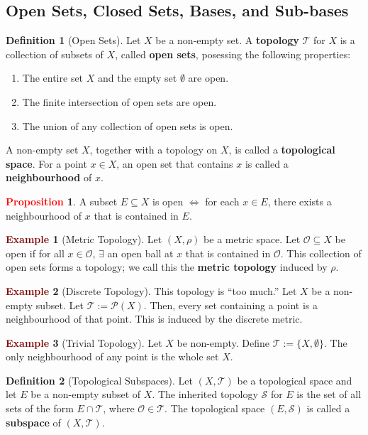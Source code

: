 \documentclass[11pt]{article}
\newcommand{\open}[0]{\mathcal{O}}
\newcommand{\topo}[0]{\mathcal{T}}
\theoremstyle{definition}
\theoremstyle{definition}
\theoremstyle{definition}
\newtheorem{definition}{\textcolor{OliveGreen}{Definition}}
\newtheorem{prop}{\textcolor{red}{Proposition}}
\newtheorem{ex}{\textcolor{Maroon}{Example}}
\theoremstyle{remark}
\begin{document}
\subsection{Open Sets, Closed Sets, Bases, and Sub-bases}

\begin{definition}[Open Sets] 
	Let $X$ be a non-empty set. A \textbf{topology} $\topo$ for $X$ is a collection of subsets of $X$, called \textbf{open sets}, posessing the following properties: 
	\begin{enumerate}[noitemsep]
		\item The entire set $X$ and the empty set $\emptyset$ are open. 
		\item The finite intersection of open sets are open. 
		\item The union of any collection of open sets is open. 
	\end{enumerate}
	A non-empty set $X$, together with a topology on $X$, is called a \textbf{topological space}. For a point $x \in X$, an open set that contains $x$ is called a \textbf{neighbourhood} of $x$. 
\end{definition}

\begin{prop}
	A subset $E \subseteq X$ is open $\iff$ for each $x \in E$, there exists a neighbourhood of $x$ that is contained in $E$. 
\end{prop}

\begin{ex}[Metric Topology]
	Let $(X, \rho)$ be a metric space. Let $\open \subseteq X$ be  open if for all $x \in \open$, $\exists$ an open ball at $x$ that is contained in $\open$. This collection of open sets forms a topology; we call this the \textbf{metric topology} induced by $\rho$. 
\end{ex}

\begin{ex}[Discrete Topology] 
	This topology is ``too much.'' Let $X$ be a non-empty subset. Let $\topo := \mathcal{P}(X)$. Then, every set containing a point is a neighbourhood of that point. This is induced by the discrete metric. 
\end{ex}

\begin{ex}[Trivial Topology]
	Let $X$ be non-empty. Define $\topo := \{ X, \emptyset \}$. The only neighbourhood of any point is the whole set $X$. 	
\end{ex}

\begin{definition}[Topological Subspaces]
	Let $(X, \topo)$ be a topological space and let $E$ be a non-empty subset of $X$. The inherited topology $\mathcal{S}$ for $E$ is the set of all sets of the form $E \cap \topo$, where $\open \in \topo$. The topological space $(E, \mathcal{S})$ is called a \textbf{subspace} of $(X, \topo)$. 
\end{definition}
\end{document}
